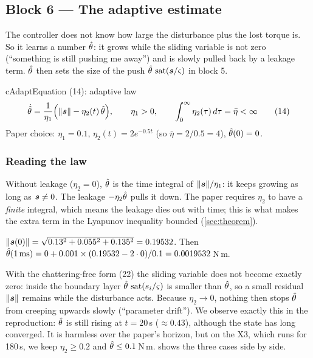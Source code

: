 \subsection{Block 6 --- The adaptive estimate}
\label{sec:b6}

\begin{idea}
The controller does not know how large the disturbance plus the lost torque is. So it learns a number $\hat{\theta}$: it
grows while the sliding variable is not zero (``something is still pushing me away'') and is slowly pulled back by a
leakage term. $\hat{\theta}$ then sets the size of the push $\hat{\theta}\,\operatorname{sat}(\bm{s}/\varsigma)$ in block 5.
\end{idea}

\begin{eqbox}{cAdapt}{Equation (14): adaptive law}
\begin{equation}
\dot{\hat{\theta}}=\frac{1}{\eta_1}\Big(\|\bm{s}\|-\eta_2(t)\,\hat{\theta}\Big),\qquad \eta_1>0,\qquad
\int_0^\infty\eta_2(\tau)\,d\tau=\bar\eta<\infty \tag{14}\label{eq:adapt}
\end{equation}
Paper choice: $\eta_1=0.1$, $\eta_2(t)=2e^{-0.5t}$ (so $\bar\eta=2/0.5=4$), $\hat{\theta}(0)=0$.
\end{eqbox}

\subsubsection*{Reading the law}
Without leakage ($\eta_2=0$), $\hat{\theta}$ is the time integral of $\|\bm{s}\|/\eta_1$: it keeps growing as long as $\bm{s}\ne0$. The
leakage $-\eta_2\hat{\theta}$ pulls it down. The paper requires $\eta_2$ to have a \emph{finite} integral, which means the leakage
dies out with time; this is what makes the extra term in the Lyapunov inequality bounded (\cref{sec:theorem}).

\begin{toybox}[one Euler step, $\Delta t=1$\,ms, from $\that=0$]
$\|\bm{s}(0)\|=\sqrt{0.13^2+0.055^2+0.135^2}=0.19532$. Then
$\hat{\theta}(1\,\text{ms})=0+0.001\times(0.19532-2\cdot0)/0.1=0.0019532$\,N\,m.
\end{toybox}

\begin{warn}
With the chattering-free form (22) the sliding variable does not become exactly zero: inside the boundary layer
$\hat{\theta}\,\operatorname{sat}(s_i/\varsigma)$ is smaller than $\hat{\theta}$, so a small residual $\|\bm{s}\|$ remains while the disturbance acts. Because
$\eta_2\to0$, nothing then stops $\hat{\theta}$ from creeping upwards slowly (``parameter drift''). We observe exactly this
in the reproduction: $\hat{\theta}$ is still rising at $t=20$\,s ($\approx0.43$), although the state has long converged. It is
harmless over the paper's horizon, but on the X3, which runs for 180\,s, we keep $\eta_2\ge0.2$ and $\hat{\theta}\le0.1$\,N\,m.
 shows the three cases side by side.
\end{warn}

